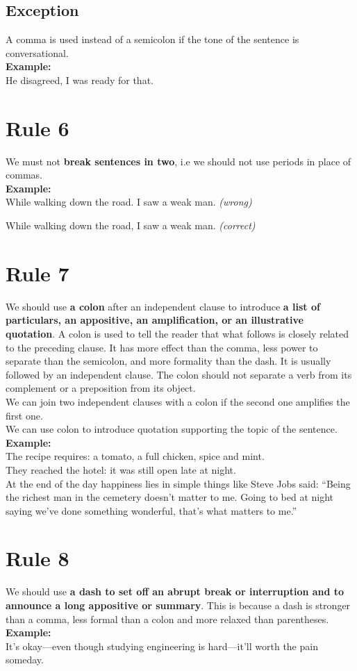 \documentclass[12pt]{report}
\begin{document}
\subsection{Exception}
A comma is used instead of a semicolon if the tone of the sentence is conversational.\\ \textbf{Example:}\\
He disagreed, I was ready for that.


\section{Rule 6}
We must not \textbf{break sentences in two}, i.e we should not use periods in place of commas.\\
\textbf{Example:}\\
While walking down the road. I saw a weak man. \textit{(wrong)}

While walking down the road, I saw a weak man. \textit{(correct)}


\section{Rule 7}
We should use \textbf{a colon} after an independent clause to introduce \textbf{ a list of particulars, an appositive, an amplification, or an illustrative quotation}. A colon is used to tell the reader that what follows is closely related to the preceding clause. It has more effect than the comma, less power to separate than the semicolon, and more formality than the dash. It is usually followed by an independent clause. The colon should not separate a verb from its complement or a preposition from its object.\\
We can join two independent clauses with a colon if the second one amplifies the first one.\\
We can use colon to introduce quotation supporting the topic of the sentence.\\
\textbf{Example:}\\
The recipe requires: a tomato, a full chicken, spice and mint.\\
They reached the hotel: it was still open late at night.\\
At the end of the day happiness lies in simple things like Steve Jobs said: ``Being the richest man in the cemetery doesn't matter to me. Going to bed at night saying we've done something wonderful, that's what matters to me.''


\section{Rule 8}
We should use \textbf{a dash to set off an abrupt break or interruption and to announce a long appositive or summary}. This is because a dash is stronger than a comma, less formal than a colon and more relaxed than parentheses.\\
\textbf{Example:}\\
It's okay---even though studying engineering is hard---it'll worth the pain someday.
\end{document}
